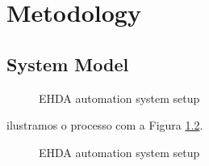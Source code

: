 \chapter{Metodology}
\label{chap:Metodology}


\section{System Model}
\label{sec:control_model}

\begin{figure}[H]
    \centering
    \caption{EHDA automation system setup}
    \label{fig:metodology_example1}
\end{figure}


ilustramos o processo com a Figura \ref{fig:control_model_fig}. 

\begin{figure}[H]
  \centering
  \caption{EHDA automation system setup}
  \label{fig:control_model_fig}
\end{figure}

